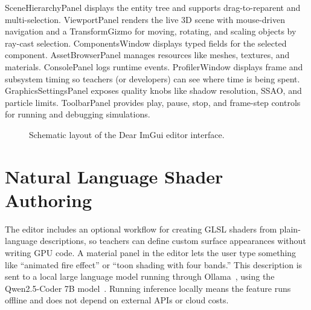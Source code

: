 \documentclass[9pt,openany]{extbook}
\begin{document}
SceneHierarchyPanel displays the entity tree and supports drag-to-reparent and multi-selection. ViewportPanel renders the live 3D scene with mouse-driven navigation and a TransformGizmo for moving, rotating, and scaling objects by ray-cast selection. ComponentsWindow displays typed fields for the selected component. AssetBrowserPanel manages resources like meshes, textures, and materials. ConsolePanel logs runtime events. ProfilerWindow displays frame and subsystem timing so teachers (or developers) can see where time is being spent. GraphicsSettingsPanel exposes quality knobs like shadow resolution, SSAO, and particle limits. ToolbarPanel provides play, pause, stop, and frame-step controls for running and debugging simulations.
\begin{figure}[h]
\centering
{}
\caption{Schematic layout of the Dear ImGui editor interface.}
\label{fig:editor_layout}
\end{figure}


\section{Natural Language Shader Authoring}

The editor includes an optional workflow for creating GLSL shaders from plain-language descriptions, so teachers can define custom surface appearances without writing GPU code. A material panel in the editor lets the user type something like ``animated fire effect'' or ``toon shading with four bands.'' This description is sent to a local large language model running through Ollama~\cite{ollama2024}, using the Qwen2.5-Coder 7B model~\cite{hui2024qwen25coder}. Running inference locally means the feature runs offline and does not depend on external APIs or cloud costs.
\end{document}
